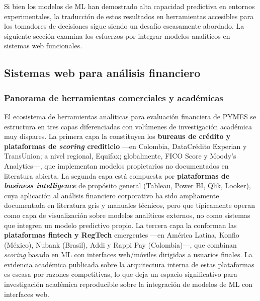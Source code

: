 \documentclass[12pt, letterpaper]{article}
\begin{document}
Si bien los modelos de ML han demostrado alta capacidad predictiva en entornos experimentales, la traducci\'on de estos resultados en herramientas accesibles para los tomadores de decisiones sigue siendo un desaf\'io escasamente abordado. La siguiente secci\'on examina los esfuerzos por integrar modelos anal\'iticos en sistemas web funcionales.

\subsection{Sistemas web para an\'alisis financiero}
\label{sec:web}

\subsubsection{Panorama de herramientas comerciales y acad\'emicas}

El ecosistema de herramientas anal\'iticas para evaluaci\'on financiera de PYMES se estructura en tres capas diferenciadas con vol\'umenes de investigaci\'on acad\'emica muy dispares. La primera capa la constituyen los \textbf{bureaus de cr\'edito y plataformas de \textit{scoring} crediticio} ---en Colombia, DataCr\'edito Experian y TransUnion; a nivel regional, Equifax; globalmente, FICO Score y Moody's Analytics---, que implementan modelos propietarios no documentados en literatura abierta. La segunda capa est\'a compuesta por \textbf{plataformas de \textit{business intelligence}} de prop\'osito general (Tableau, Power BI, Qlik, Looker), cuya aplicaci\'on al an\'alisis financiero corporativo ha sido ampliamente documentada en literatura gris y manuales t\'ecnicos, pero que t\'ipicamente operan como capa de visualizaci\'on sobre modelos anal\'iticos externos, no como sistemas que integren un modelo predictivo propio. La tercera capa la conforman las \textbf{plataformas fintech y RegTech} emergentes ---en Am\'erica Latina, Konfio (M\'exico), Nubank (Brasil), Addi y Rappi Pay (Colombia)---, que combinan \textit{scoring} basado en ML con interfaces web/m\'oviles dirigidas a usuarios finales. La evidencia acad\'emica publicada sobre la arquitectura interna de estas plataformas es escasa por razones competitivas, lo que deja un espacio significativo para investigaci\'on acad\'emica reproducible sobre la integraci\'on de modelos de ML con interfaces web.
\end{document}
